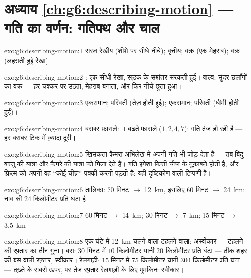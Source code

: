\section*{अध्याय \ref{ch:g6:describing-motion} --- गति का वर्णन: गतिपथ और चाल}

\begin{solution}{exo:g6:describing-motion:1}
सरल रेखीय (शीशे पर सीधे नीचे); वृत्तीय; वक्र (एक मेहराब); वक्र
(लहराती हुई रेखा)।
\end{solution}

\begin{solution}{exo:g6:describing-motion:2}
: एक सीधी रेखा, सड़क के समांतर सरकती हुई। वाल्व: सुंदर छलाँगों का
वक्र --- हर चक्कर पर उठता, मेहराब बनाता, और फिर नीचे छूता हुआ।
\end{solution}

\begin{solution}{exo:g6:describing-motion:3}
एकसमान; परिवर्ती (तेज़ होती हुई); एकसमान; परिवर्ती (धीमी होती हुई)।
\end{solution}

\begin{solution}{exo:g6:describing-motion:4}
बराबर फ़ासले: । बढ़ते फ़ासले ($1, 2, 4, 7$): गति तेज़ हो रही
है --- हर बराबर टिक में ज़्यादा दूरी।
\end{solution}

\begin{solution}{exo:g6:describing-motion:5}
खिसकता कैमरा अभिलेख में अपनी गति भी जोड़ देता है --- तब बिंदु वस्तु की
यात्रा और कैमरे की यात्रा को मिला देते हैं। गति हमेशा किसी चीज़ के
मुक़ाबले होती है, और फ़िल्म को अपनी वह ``कोई चीज़'' पक्की करनी पड़ती
है: यही दृष्टिकोण वाली टिप्पणी है।
\end{solution}

\begin{solution}{exo:g6:describing-motion:6}
तालिका: $30$ मिनट $\to$ \qty{12}{km}, इसलिए $60$ मिनट $\to$
\qty{24}{km}: नाव की  $24$ किलोमीटर प्रति घंटा है।
\end{solution}

\begin{solution}{exo:g6:describing-motion:7}
$60$ मिनट $\to$ \qty{14}{km}; $30$ मिनट $\to$ \qty{7}{km}; $15$
मिनट $\to$ \qty{3.5}{km}।
\end{solution}

\begin{solution}{exo:g6:describing-motion:8}
एक घंटे में \qty{12}{km} चलने वाला टहलने वाला: अस्वीकार --- टहलने की
रफ़्तार का तीन गुना। बस: $30$ मिनट में $10$ किलोमीटर यानी $20$
किलोमीटर प्रति घंटा --- ठीक शहर की बस वाली रफ़्तार, स्वीकार।
रेलगाड़ी: $15$ मिनट में $75$ किलोमीटर यानी $300$ किलोमीटर प्रति घंटा
--- तख़्ते के सबसे ऊपर, पर तेज़ रफ़्तार रेलगाड़ी के लिए मुमकिन:
स्वीकार।
\end{solution}


